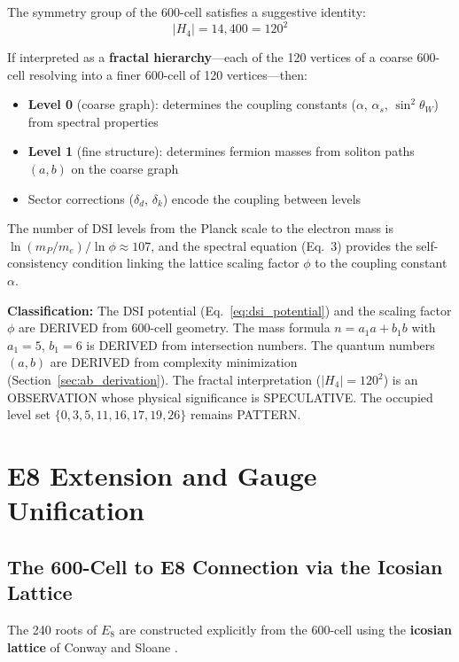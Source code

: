 \documentclass[12pt,a4paper]{article}
\begin{document}
The symmetry group of the 600-cell satisfies a suggestive identity:
\begin{equation}
|H_4| = 14{,}400 = 120^2
\end{equation}

If interpreted as a \textbf{fractal hierarchy}---each of the 120 vertices of a coarse 600-cell resolving into a finer 600-cell of 120 vertices---then:
\begin{itemize}
    \item \textbf{Level 0} (coarse graph): determines the coupling constants ($\alpha$, $\alpha_s$, $\sin^2\theta_W$) from spectral properties
    \item \textbf{Level 1} (fine structure): determines fermion masses from soliton paths $(a,b)$ on the coarse graph
    \item Sector corrections ($\delta_d$, $\delta_k$) encode the coupling between levels
\end{itemize}

The number of DSI levels from the Planck scale to the electron mass is $\ln(m_P/m_e)/\ln\phi \approx 107$, and the spectral equation (Eq.~3) provides the self-consistency condition linking the lattice scaling factor $\phi$ to the coupling constant $\alpha$.

\textbf{Classification:} The DSI potential (Eq.~\ref{eq:dsi_potential}) and the scaling factor $\phi$ are DERIVED from 600-cell geometry. The mass formula $n = a_1 a + b_1 b$ with $a_1 = 5$, $b_1 = 6$ is DERIVED from intersection numbers. The quantum numbers $(a,b)$ are DERIVED from complexity minimization (Section~\ref{sec:ab_derivation}). The fractal interpretation ($|H_4| = 120^2$) is an OBSERVATION whose physical significance is SPECULATIVE. The occupied level set $\{0, 3, 5, 11, 16, 17, 19, 26\}$ remains PATTERN.

\section{E8 Extension and Gauge Unification}

\subsection{The 600-Cell to E8 Connection via the Icosian Lattice}
\label{sec:e8}

The 240 roots of $E_8$ are constructed explicitly from the 600-cell using the \textbf{icosian lattice} of Conway and Sloane \cite{conway1998icosian}.
\end{document}
